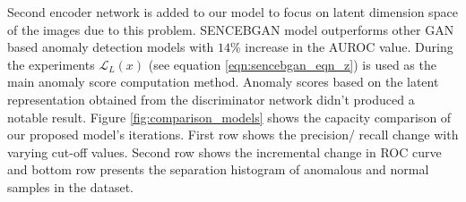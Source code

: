 Second encoder network is added to our model to focus on latent dimension space of the images due to this problem. SENCEBGAN model 
outperforms other GAN based anomaly detection models with $14\%$ increase in the AUROC value. During the experiments $\mathcal{L}_{L}
(x)$ (see equation \ref{eqn:sencebgan_eqn_z}) is used as the main anomaly score computation method. Anomaly scores based on the 
latent representation obtained from the discriminator network didn't produced a notable result. Figure \ref{fig:comparison_models}
shows the capacity comparison of our proposed model's iterations. First row shows the precision/ recall change with varying 
cut-off values. Second row shows the incremental change in ROC curve and bottom row presents the separation histogram of 
anomalous and normal samples in the dataset. 



\endgroup

